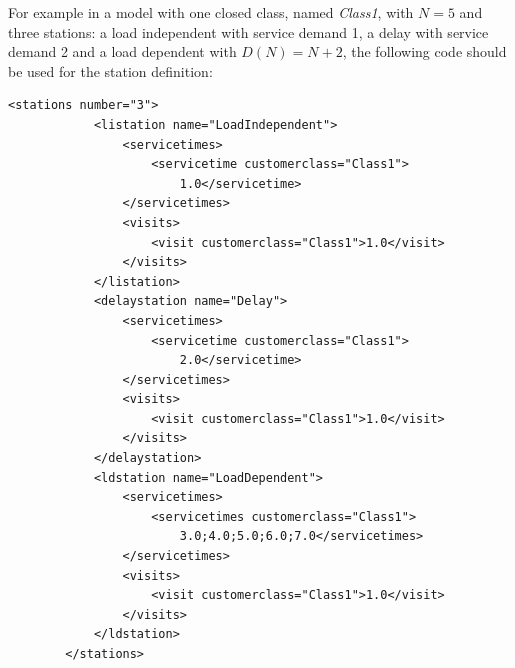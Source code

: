 For example in a model with one closed class, named \emph{Class1},
with $N=5$ and three stations: a load independent with service
demand 1, a delay with service demand 2 and a load dependent with
$D(N)=N+2$, the following code should be used for the station
definition:

\begin{lstlisting}[gobble=7]
        <stations number="3">
            <listation name="LoadIndependent">
                <servicetimes>
                    <servicetime customerclass="Class1">
                        1.0</servicetime>
                </servicetimes>
                <visits>
                    <visit customerclass="Class1">1.0</visit>
                </visits>
            </listation>
            <delaystation name="Delay">
                <servicetimes>
                    <servicetime customerclass="Class1">
                        2.0</servicetime>
                </servicetimes>
                <visits>
                    <visit customerclass="Class1">1.0</visit>
                </visits>
            </delaystation>
            <ldstation name="LoadDependent">
                <servicetimes>
                    <servicetimes customerclass="Class1">
                        3.0;4.0;5.0;6.0;7.0</servicetimes>
                </servicetimes>
                <visits>
                    <visit customerclass="Class1">1.0</visit>
                </visits>
            </ldstation>
        </stations>
\end{lstlisting}

